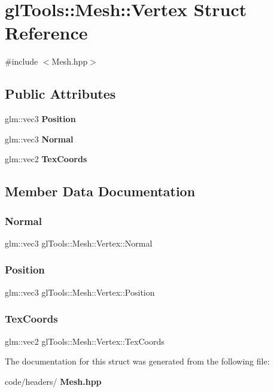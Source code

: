 \section{gl\+Tools\+::Mesh\+::Vertex Struct Reference}
\label{structgl_tools_1_1_mesh_1_1_vertex}


{\ttfamily \#include $<$Mesh.\+hpp$>$}

\subsection*{Public Attributes}
\begin{DoxyCompactItemize}
\item 
glm\+::vec3 \textbf{ Position}
\item 
glm\+::vec3 \textbf{ Normal}
\item 
glm\+::vec2 \textbf{ Tex\+Coords}
\end{DoxyCompactItemize}


\subsection{Member Data Documentation}
\mbox{\label{structgl_tools_1_1_mesh_1_1_vertex_a9354dcd8569befa0f9034bd133e2194a}} 
\subsubsection{Normal}
{\footnotesize\ttfamily glm\+::vec3 gl\+Tools\+::\+Mesh\+::\+Vertex\+::\+Normal}

\mbox{\label{structgl_tools_1_1_mesh_1_1_vertex_adcae73635daaef1d41adde491910e30d}} 
\subsubsection{Position}
{\footnotesize\ttfamily glm\+::vec3 gl\+Tools\+::\+Mesh\+::\+Vertex\+::\+Position}

\mbox{\label{structgl_tools_1_1_mesh_1_1_vertex_aca99714f01d57d1421181f2dd58d2ab6}} 
\subsubsection{TexCoords}
{\footnotesize\ttfamily glm\+::vec2 gl\+Tools\+::\+Mesh\+::\+Vertex\+::\+Tex\+Coords}



The documentation for this struct was generated from the following file\+:\begin{DoxyCompactItemize}
\item 
code/headers/\textbf{ Mesh.\+hpp}\end{DoxyCompactItemize}
